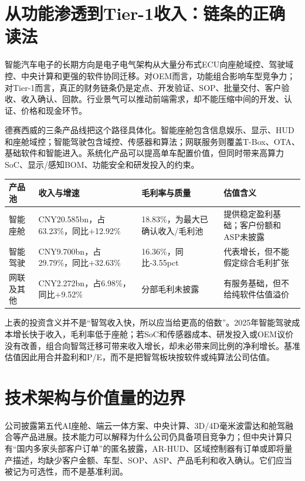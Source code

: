 \section{从功能渗透到Tier-1收入：链条的正确读法}

智能汽车电子的长期方向是电子电气架构从大量分布式ECU向座舱域控、驾驶域控、中央计算和更强的软件协同迁移。对OEM而言，功能组合影响车型竞争力；对Tier-1而言，真正的财务链条仍是定点、开发验证、SOP、批量交付、客户验收、收入确认、回款。行业景气可以推动前端需求，却不能压缩中间的开发、认证、价格和现金环节。

德赛西威的三条产品线把这个路径具体化。智能座舱包含信息娱乐、显示、HUD和座舱域控；智能驾驶包含域控、传感器和算法；网联服务则覆盖T-Box、OTA、基础软件和智能进入。系统化产品可以提高单车配置价值，但同时带来高算力SoC、显示/感知BOM、功能安全和研发投入的约束。

\begin{exhibitbox}[2025年已确认的产品池]
\small
\begin{tabularx}{\textwidth}{L{2.6cm}Y Y Y}
\toprule
产品池 & 收入与增速 & 毛利率与质量 & 估值含义 \\
\midrule
智能座舱 & CNY20.585bn，占63.23\%，同比+12.92\% & 18.83\%，为最大已确认收入/毛利池 & 提供稳定盈利基础；客户份额和ASP未披露 \\
智能驾驶 & CNY9.700bn，占29.79\%，同比+32.63\% & 16.36\%，同比-3.55pct & 代表增长，但不能假定综合毛利扩张 \\
网联及其他 & CNY2.272bn，占6.98\%，同比+9.52\% & 分部毛利未披露 & 有服务基础，但不给纯软件估值溢价 \\
\bottomrule
\end{tabularx}
\end{exhibitbox}

上表的投资含义并不是“智驾收入快，所以应当给更高的倍数”。2025年智能驾驶成本增长快于收入，毛利率低于座舱；若SoC和传感器成本、研发投入或OEM议价没有改善，组合向智驾迁移可带来收入增长，却未必带来同比例的净利增长。基准估值因此用合并盈利和P/E，而不是把智驾板块按软件或纯算法公司估值。

\section{技术架构与价值量的边界}

公司披露第五代AI座舱、端云一体方案、中央计算、3D/4D毫米波雷达和舱驾融合等产品进展。技术能力可以解释为什么公司仍具备项目竞争力；但中央计算只有“国内多家头部客户订单”的匿名披露，AR-HUD、区域控制器有订单或即将量产描述，均缺少客户金额、车型、SOP、ASP、产品毛利和收入确认。它们应当被记为可选性，而不是基准利润。

